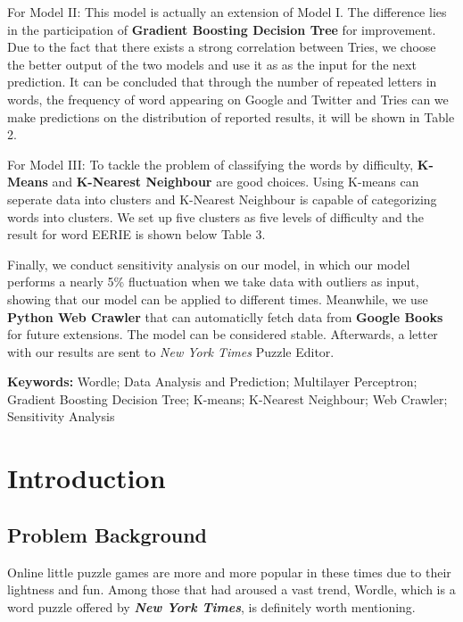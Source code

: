 \documentclass[12pt]{article}
\begin{document}
For Model II: This model is actually an extension of Model I. The difference lies in the participation of \textbf{Gradient Boosting Decision Tree} for improvement. Due to the fact that there exists a strong correlation between Tries, we choose the better output of the two models and use it as as the input for the next prediction. It can be concluded that through the number of repeated letters in words, the frequency of word appearing on Google and Twitter and Tries can we make predictions on the distribution of reported results, it will be shown in Table 2.

For Model III: To tackle the problem of classifying the words by difficulty, \textbf{K-Means} and \textbf{K-Nearest Neighbour} are good choices. Using K-means can seperate data into clusters and K-Nearest Neighbour is capable of categorizing words into clusters. We set up five clusters as five levels of difficulty and the result for word EERIE is shown below Table 3.

Finally, we conduct sensitivity analysis on our model, in which our model performs a nearly 5\% fluctuation when we take data with outliers as input, showing that our model can be applied to different times. Meanwhile, we use \textbf{Python Web Crawler} that can automaticlly fetch data from \textbf{Google Books} for future extensions. The model can be considered stable. Afterwards, a letter with our results are sent to \textit{New York Times} Puzzle Editor.

\vspace{1cm}
\noindent\textbf{Keywords:} Wordle; Data Analysis and Prediction; Multilayer Perceptron; Gradient Boosting Decision Tree; K-means; K-Nearest Neighbour; Web Crawler; Sensitivity Analysis

\clearpage
\pagestyle{fancy}
\newpage
\setcounter{page}{1}
\maketitle
\tableofcontents
\newpage

\section{Introduction}
\subsection{Problem Background}
\indent Online little puzzle games are more and more popular in these times due to their lightness and fun. Among those that had aroused a vast trend, Wordle, which is a word puzzle offered by \textbf{\textit{New York Times}}, is definitely worth mentioning. 
\end{document}
